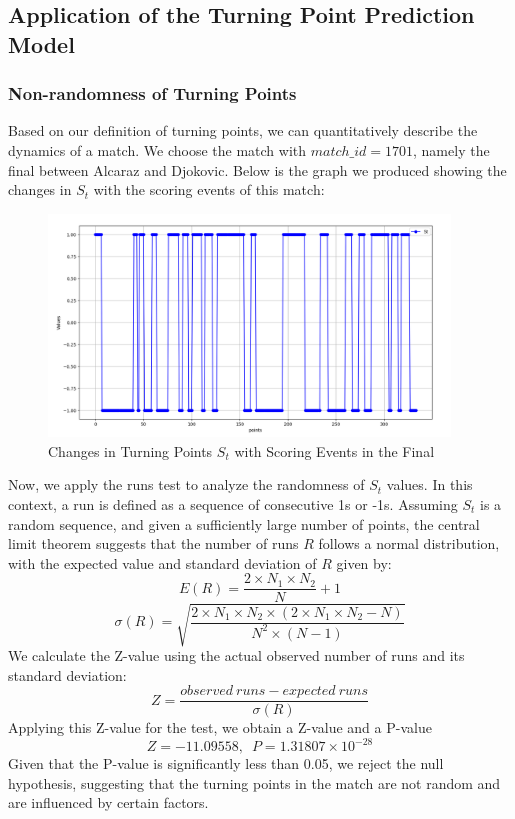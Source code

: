 \documentclass[UTF8]{ctexart} %
\begin{document}
\subsection{\textbf{Application of the Turning Point Prediction Model}}
\subsubsection{\textbf{Non-randomness of Turning Points}}
Based on our definition of turning points, we can quantitatively describe the dynamics of a match. We 
choose the match with \(match\_id = 1701\), namely the final between Alcaraz and Djokovic. Below is the 
graph we produced showing the changes in \(S_t\) with the scoring events of this match:

\begin{figure}[H]
    \centering
    \includegraphics[width=0.95\textwidth]{./graph/true_swings.png}
    \caption{Changes in Turning Points \(S_t\) with Scoring Events in the Final}
\end{figure}

Now, we apply the runs test to analyze the randomness of \(S_t\) values. In this context, a run is 
defined as a sequence of consecutive 1s or -1s. Assuming \(S_t\) is a random sequence, and given a 
sufficiently large number of points, the central limit theorem suggests that the number of runs \(R\) 
follows a normal distribution, with the expected value and standard deviation of \(R\) given by:
\[E(R) = \frac{2 \times N_1 \times N_2}{N} + 1\]
\[\sigma(R) = \sqrt{\frac{2 \times N_1 \times N_2 \times (2 \times N_1 \times N_2 - N)}{N^2 \times (N - 1)}}\]
We calculate the Z-value using the actual observed number of runs and its standard deviation:
\[Z = \frac{observed\ runs - expected\ runs}{\sigma(R)}\]
Applying this Z-value for the test, we obtain a Z-value and a P-value $$Z = -11.09558,\enspace P = 1.31807\times 10^{-28}$$ 
Given that the P-value is significantly less than 
0.05, we reject the null hypothesis, suggesting that the turning points in the match are not random and 
are influenced by certain factors.
\end{document}
